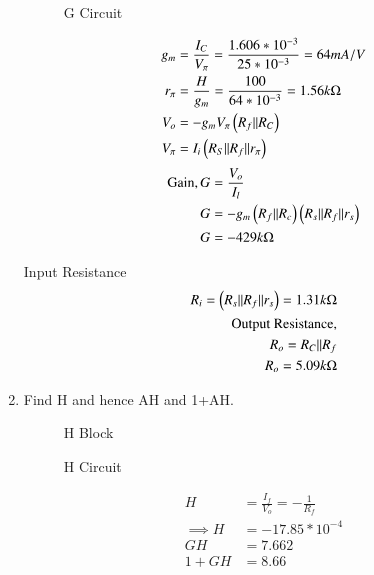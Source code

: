 \begin{enumerate}[label=\thesection.\arabic*.,ref=\thesection.\theenumi]
 \begin{figure}[!ht]
 	\begin{center}
 			\resizebox{\columnwidth}{!}{}
 	\end{center}
 \caption{G Circuit}
 \label{fig: G ckt}
 \end{figure}

\begin{align}
    g_{m} &= \frac{I_{C}}{V_{\pi}}
    = \frac{1.606*10^{-3}}{25*10^{-3}}
    = 64 mA/V\\
    r_{\pi} &= \frac{H    }{g_{m}} = \frac{100}{64*10^{-3}}
    = 1.56 k \ohm\\
     V_{o} &= -g_{m}V_{\pi}\left(R_{f} || R_{C}\right) \\
    V_{\pi} &= I_{i}\left(R_{S} || R_{f} || r_{\pi}\right)
\end{align}
\begin{align}
    \text{Gain}, G &= \frac{V_{o}}{I_{l}}\\
    G &= -g_{m} \left(R_{f} || R_{c}\right) \left(R_{s}|| R_{f} || r_{s}\right)\\
    G &= -429 k\ohm
\end{align}

Input Resistance
\begin{align}
    R_{i} = \left(R_{s} || R_{f} || r_{s}\right) = 1.31 k\ohm\\
    \text{Output Resistance},\\
    R_{o} = R_{C} || R_{f}\\
    R_{o} = 5.09 k\ohm
\end{align}

\item Find H and hence AH and 1+AH.

\solution 
 \begin{figure}[!ht]
 	\begin{center}
 			\resizebox{\columnwidth}{!}{}
 	\end{center}
 \caption{H Block}
 \label{fig:  H blk}
 \end{figure}
 
  \begin{figure}[!ht]
 	\begin{center}
 			\resizebox{\columnwidth}{!}{}
 	\end{center}
 \caption{H Circuit}
 \label{fig:  H ckt}
 \end{figure}
 
\begin{align}
    H &= \frac{I_{f}}{V_{o}}
    = -\frac{1}{R_{f}}\\
    \implies H &= -17.85*10^{-4}\\
    GH &= 7.662\\
    1 + GH &= 8.66
\end{align}


\end{enumerate}
